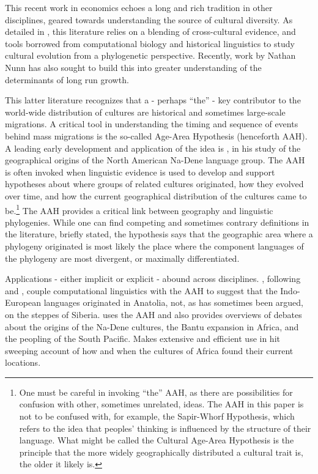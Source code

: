 \documentclass[11pt]{article}
\begin{document}
This recent work in economics echoes a long and rich tradition in other disciplines, geared towards understanding the source of cultural diversity. As detailed in \cite{mace05}, this literature relies on a blending of cross-cultural evidence, and tools borrowed from computational biology and historical linguistics to study cultural evolution from a phylogenetic perspective. Recently, work by Nathan Nunn has also sought to build this into greater understanding of the determinants of long run growth. 

This latter literature recognizes that a - perhaps ``the'' - key contributor to the world-wide distribution of cultures are historical and sometimes large-scale migrations. A critical tool in understanding the timing and sequence of events behind mass migrations is the so-called Age-Area Hypothesis (henceforth AAH). A leading early development and application of the idea is \cite{sapir16}, in his study of the geographical origins of the North American Na-Dene language group. The AAH is often invoked when linguistic evidence is used to develop and support hypotheses about where groups of related  cultures originated, how they evolved over time, and how the current geographical distribution of the cultures came to be.\footnote{One must be careful in invoking ``the'' AAH, as there are possibilities for confusion with other, sometimes unrelated, ideas. The AAH in this paper is not to be confused with, for example, the Sapir-Whorf Hypothesis, which refers to the idea that peoples' thinking is influenced by the structure of their language. What might be called the Cultural Age-Area Hypothesis is the principle that the more widely geographically distributed a cultural trait is, the older it likely is. } The AAH provides a critical link between geography and linguistic phylogenies. While one can find competing and sometimes contrary definitions in the literature, briefly stated, the hypothesis says that the geographic area where a phylogeny originated is most likely the place where the component languages of the phylogeny are most divergent, or maximally differentiated.

Applications - either implicit or explicit  - abound across disciplines. \cite{atkinson03}, following \cite{renfrew87} and \cite{dogolpolsky88}, couple computational linguistics with the AAH to suggest that the Indo-European languages originated in Anatolia, not, as has sometimes been argued, on the steppes of Siberia. \cite{ruhlen94} uses the AAH and also provides overviews of debates about the origins of the Na-Dene cultures, the Bantu expansion in Africa, and the peopling of the South Pacific. \cite{ehret01} Makes extensive and efficient use in hit sweeping account of how and when the cultures of Africa found their current locations.
\end{document}
